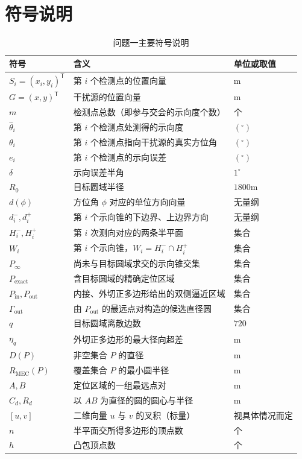 \section{符号说明}

\begin{table}[htbp]
\centering
\small
\caption{问题一主要符号说明}
\label{tab:q1_symbols}
\begin{tabular}{lll}
\toprule
符号 & 含义 & 单位或取值 \\
\midrule
$S_i=(x_i,y_i)^{\mathsf T}$ & 第 $i$ 个检测点的位置向量 & m \\
$G=(x,y)^{\mathsf T}$ & 干扰源的位置向量 & m \\
$m$ & 检测点总数（即参与交会的示向度个数） & 个 \\
$\hat\theta_i$ & 第 $i$ 个检测点处测得的示向度 & $(^\circ)$ \\
$\theta_i$ & 第 $i$ 个检测点指向干扰源的真实方位角 & $(^\circ)$ \\
$e_i$ & 第 $i$ 个检测点的示向误差 & $(^\circ)$ \\
$\delta$ & 示向误差半角 & $1^\circ$ \\
$R_0$ & 目标圆域半径 & $1800\mathrm{m}$ \\
$d(\phi)$ & 方位角 $\phi$ 对应的单位方向向量 & 无量纲 \\
$d_i^-,d_i^+$ & 第 $i$ 个示向锥的下边界、上边界方向 & 无量纲 \\
$H_i^-,H_i^+$ & 第 $i$ 次测向对应的两条半平面 & 集合 \\
$W_i$ & 第 $i$ 个示向锥，$W_i=H_i^-\cap H_i^+$ & 集合 \\
$P_\infty$ & 尚未与目标圆域求交的示向锥交集 & 集合 \\
$P_{\mathrm{exact}}$ & 含目标圆域的精确定位区域 & 集合 \\
$P_{\mathrm{in}},P_{\mathrm{out}}$ & 内接、外切正多边形给出的双侧逼近区域 & 集合 \\
$\Gamma_{\mathrm{out}}$ & 由 $P_{\mathrm{out}}$ 的最远点对构造的候选直径圆 & 集合 \\
$q$ & 目标圆域离散边数 & $720$ \\
$\eta_q$ & 外切正多边形的最大径向超差 & m \\
$D(P)$ & 非空集合 $P$ 的直径 & m \\
$R_{\mathrm{MEC}}(P)$ & 覆盖集合 $P$ 的最小圆半径 & m \\
$A,B$ & 定位区域的一组最远点对 & m \\
$C_d,R_d$ & 以 $AB$ 为直径的圆的圆心与半径 & m \\
$[u,v]$ & 二维向量 $u$ 与 $v$ 的叉积（标量） & 视具体情况而定 \\
$n$ & 半平面交所得多边形的顶点数 & 个 \\
$h$ & 凸包顶点数 & 个 \\
\bottomrule
\end{tabular}
\end{table}

